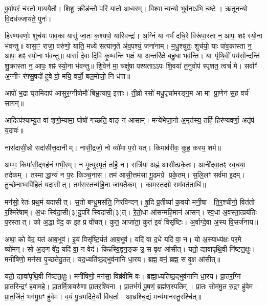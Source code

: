 पू॒र्वा॒प॒रं च॑रतो मा॒ययै॒तौ।
शिशू॒ क्रीड॑न्तौ॒ परि॑ यातो अध्व॒रम्।
विश्वान्य॒न्यो भुव॑नाऽभि॒ चष्टे।
ऋ॒तून॒न्यो वि॒दध॑ज्जायते॒ पुनः॑।

हिर॑ण्यवर्णाः॒ शुच॑यः पाव॒का यासु॑ जा॒तः क॒श्यपो॒ यास्विन्द्रः॑।
अ॒ग्निं या गर्भं॑ दधि॒रे विरू॑पा॒स्ता न॒ आपः॒ शꣴ स्यो॒ना भ॑वन्तु॥ 
यासा॒ꣳ॒ राजा॒ वरु॑णो॒ याति॒ मध्ये॑ सत्यानृ॒ते अ॑व॒पश्यं॒ जना॑नाम्।
म॒धु॒श्चुतः॒ शुच॑यो॒ याः पा॑व॒कास्ता न॒ आपः॒ शꣴ स्यो॒ना भ॑वन्तु॥ 
यासां᳚ दे॒वा दि॒वि कृ॒ण्वन्ति॑ भ॒क्षं या अ॒न्तरि॑क्षे बहु॒धा भव॑न्ति।
याः पृ॑थि॒वीं पय॑सो॒न्दन्ति॑ शु॒क्रास्ता न॒ आपः॒ शꣴ स्यो॒ना भ॑वन्तु॥ 
शि॒वेन॑ मा॒ चक्षु॑षा पश्यताऽऽपः शि॒वया॑ त॒नुवोप॑ स्पृशत॒ त्वचं॑ मे।
सर्वाꣳ॑ अ॒ग्नीꣳ र॑फ्सु॒षदो॑ हुवे वो॒ मयि॒ वर्चो॒ बल॒मोजो॒ नि ध॑त्त॥

आपो॑ भ॒द्रा घृ॒तमिदाप॑ आसुर॒ग्नीषोमौ॑ बिभ्र॒त्याप॒ इत्ताः।
ती॒व्रो रसो॑ मधु॒पृचा॑मरङ्ग॒म आ मा प्रा॒णेन॑ स॒ह वर्च॑ सागन्॥

आदित्प॑श्याम्यु॒त वा॑ शृणो॒म्यामा॒ घोषो॑ गच्छति॒ वाङ् न॑ आसाम्।
मन्ये॑भेजा॒नो अ॒मृत॑स्य॒ तर्\mbox{}हि॒ हिर॑ण्यवर्णा॒ अतृ॑पं य॒दावः॑॥


नास॑दासी॒न्नो सदा॑सीत्त॒दानीम्।
नासी॒द्रजो॒ नो व्यो॑मा प॒रो यत्।
किमाव॑रीवः॒ कुह॒ कस्य॒ शर्म\sn{}॥

अम्भः॒ किमा॑सी॒द्गह॑नं गभी॒रम्।
न मृ॒त्युर॒मृतं॒ तर्\mbox{}हि॒ न।
रात्रि॑या॒ अह्न॑ आसीत्प्रके॒तः।
आनी॑दवा॒तꣴ स्व॒धया॒ तदेकम्।
तस्माद्धा॒न्यं न प॒रः किञ्च॒नास॑।
तम॑ आसी॒त्तम॑सा गू॒ढमग्रे प्रके॒तम्।
स॒लि॒लꣳ सर्व॑मा इ॒दम्।
तु॒च्छेना॒भ्वपि॑हितं॒ यदासीत्।
तम॑स॒स्तन्म॑हि॒ना जा॑य॒तैकम्।
काम॒स्तदग्रे॒ सम॑वर्त॒ताधि॑॥

मन॑सो॒ रेतः॑ प्रथ॒मं यदासीत्।
स॒तो बन्धु॒मस॑ति॒ निर॑विन्दन्।
हृ॒दि प्र॒तीष्या॑ क॒वयो॑ मनी॒षा।
ति॒र॒श्चीनो॒ वित॑तो र॒श्मिरे॑षाम्।
अ॒धः स्वि॑दा॒सी(३)दु॒परि॑ स्विदासी(३)त्।
रे॒तो॒धा आ॑सन्महि॒मान॑ आसन्।
स्व॒धा अ॒वस्ता॒त्प्रय॑तिः प॒रस्तात्।
को अ॒द्धा वे॑द॒ क इ॒ह प्र वो॑चत्।
कुत॒ आजा॑ता॒ कुत॑ इ॒यं विसृ॑ष्टिः।
अ॒र्वाग्दे॒वा अ॒स्य वि॒सर्ज॑नाय॥

अथा॒ को वे॑द॒ यत॑ आब॒भूव॑।
इ॒यं विसृ॑ष्टि॒र्यत॑ आब॒भूव॑।
यदि॑ वा द॒धे यदि॑ वा॒ न।
यो अ॒स्याध्य॑क्षः पर॒मे व्यो॑मन्।
सो अ॒ङ्ग वे॑द॒ यदि॑ वा॒ न वेद॑।
किꣴस्वि॒द्वन॒ङ्क उ॒ स वृ॒क्ष आ॑सीत्।
यतो॒ द्यावा॑पृथि॒वी नि॑ष्टत॒क्षुः।
मनी॑षिणो॒ मन॑सा पृ॒च्छतेदु॒तत्।
यद॒ध्यति॑ष्ठ॒द्भुव॑नानि धा॒रय\sn{}।
ब्रह्म॒ वनं॒ ब्रह्म॒ स वृ॒क्ष आ॑सीत्॥


यतो॒ द्यावा॑पृथि॒वी नि॑ष्टत॒क्षुः।
मनी॑षिणो॒ मन॑सा॒ विब्र॑वीमि वः।
ब्रह्मा॒ध्यति॑ष्ठ॒द्भुव॑नानि धा॒रय\sn{}।
प्रा॒तर॒ग्निं प्रा॒तरिन्द्रꣳ॑ हवामहे।
प्रा॒तर्मि॒त्रावरु॑णा प्रा॒तर॒श्विना।
प्रा॒तर्भगं॑ पू॒षणं॒ ब्रह्म॑ण॒स्पतिम्।
प्रा॒तः सोम॑मु॒त रु॒द्रꣳ हु॑वेम।
प्रा॒त॒र्जितं॒ भग॑मु॒ग्रꣳ हु॑वेम।
व॒यं पु॒त्रमदि॑ते॒र्यो वि॑ध॒र्ता।
आ॒ध्रश्चि॒द्यं मन्य॑मानस्तु॒रश्चि॑त्॥


